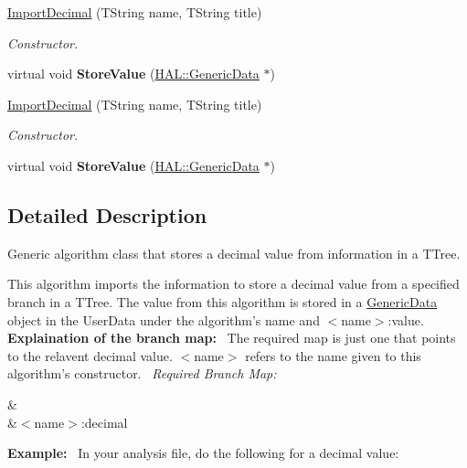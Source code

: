 \begin{DoxyCompactItemize}
\item 
\hyperlink{class_h_a_l_1_1_algorithms_1_1_import_decimal_a15781bef55e9a3ff8de1ec1f64a94ff5}{Import\+Decimal} (T\+String name, T\+String title)
\begin{DoxyCompactList}\small\item\em Constructor. \end{DoxyCompactList}\item 
\hypertarget{class_h_a_l_1_1_algorithms_1_1_import_decimal_a3044dabc75bee09871d80f32333e730f}{virtual void {\bfseries Store\+Value} (\hyperlink{class_h_a_l_1_1_generic_data}{H\+A\+L\+::\+Generic\+Data} $\ast$)}\label{class_h_a_l_1_1_algorithms_1_1_import_decimal_a3044dabc75bee09871d80f32333e730f}

\item 
\hyperlink{class_h_a_l_1_1_algorithms_1_1_import_decimal_a15781bef55e9a3ff8de1ec1f64a94ff5}{Import\+Decimal} (T\+String name, T\+String title)
\begin{DoxyCompactList}\small\item\em Constructor. \end{DoxyCompactList}\item 
\hypertarget{class_h_a_l_1_1_algorithms_1_1_import_decimal_a3044dabc75bee09871d80f32333e730f}{virtual void {\bfseries Store\+Value} (\hyperlink{class_h_a_l_1_1_generic_data}{H\+A\+L\+::\+Generic\+Data} $\ast$)}\label{class_h_a_l_1_1_algorithms_1_1_import_decimal_a3044dabc75bee09871d80f32333e730f}

\end{DoxyCompactItemize}


\subsection{Detailed Description}
Generic algorithm class that stores a decimal value from information in a T\+Tree. 

This algorithm imports the information to store a decimal value from a specified branch in a T\+Tree. The value from this algorithm is stored in a \hyperlink{class_h_a_l_1_1_generic_data}{Generic\+Data} object in the User\+Data under the algorithm's name and $<$name$>$\+:value.~\newline
~\newline
{\bfseries Explaination of the branch map\+:}~\newline
The required map is just one that points to the relavent decimal value. $<$name$>$ refers to the name given to this algorithm's constructor.~\newline
{\itshape Required Branch Map\+:} \begin{TabularC}{2}
\hline
{}&\PBS{}\\
&\PBS\centering $<$name$>$\+:decimal \\
\end{TabularC}
{\bfseries Example\+:}~\newline
In your analysis file, do the following for a decimal value\+:


